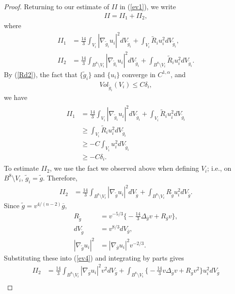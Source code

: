 \documentclass{amsart}
\newcommand{\Ri}{\widetilde{R}_i}
\newcommand{\wtg}{\widetilde{g}}
\newcommand{\di}{dV_{\widetilde{g}_i}}
\newcommand{\wti}{\widetilde{g}_i}
\theoremstyle{definition}
\theoremstyle{remark}
\numberwithin{equation}{section}
\begin{document}
\begin{proof}
Returning to our estimate of $II$ in (\ref{ev1}), we write
\begin{align} \label{ev2}
II = II_1 + II_2,
\end{align}
where
\begin{align*}II_1&=\frac{14}{3} \int_{V_i} |\nabla_{\wti} u_i |^2 \di +  \int_{V_i} \Ri u_i^2 \di,  \\
II_2 &= \frac{14}{3} \int_{B^8 \setminus V_i} |\nabla_{\wti} u_i |^2 \di +  \int_{B^8 \setminus V_i} \Ri u_i^2 \di.
\end{align*}
By (\ref{Rd2}), the fact that $\{ \wti \}$ and $\{ u_i \}$ converge in $C^{1,\alpha}$, and
\begin{align} \label{volU}
Vol_{\wti}(V_i) \leq C \delta_i,
\end{align}
we have
\begin{align} \label{ev3} \begin{split}
II_1 &= \frac{14}{3} \int_{V_i} |\nabla_{\wti} u_i |^2 \di +  \int_{V_i} \Ri u_i^2 \di \\
&\geq  \int_{V_i} \Ri u_i^2 \di \\
&\geq - C \int_{V_i} u_i^2 \di \\
&\geq - C \delta_i.
\end{split}
\end{align}
To estimate $II_2$, we use the fact we observed above when defining $V_i$; i.e., on $B^8 \setminus V_i$, $\wti = \wtg$.
Therefore,
\begin{align} \label{ev4}
II_2 &= \frac{14}{3} \int_{B^8 \setminus V_i} |\nabla_{\wtg} u_i |^2 dV_{\wtg} +  \int_{B^8 \setminus V_i} R_{\wtg} u_i^2 dV_{\wtg}.
\end{align}
Since $\wtg = v^{4/(n-2)} \overline{g}$,
\begin{align*}
R_{\wtg} &= v^{-5/3} \big\{ -\frac{14}{3} \Delta_{\overline{g}} v + R_{\overline{g}} v \big\}, \\
dV_{\wtg} &= v^{8/3}dV_{\overline{g}}, \\
|\nabla_{\wtg} u_i|^2 &= |\nabla_{\overline{g}} u_i|^2 v^{-2/3}.
\end{align*}
Substituting these into (\ref{ev4}) and integrating by parts gives
\begin{align*} %
II_2 &= \frac{14}{3} \int_{B^8 \setminus V_i} |\nabla_{\overline{g}} u_i |^2 v^2 dV_{\overline{g}}  +  \int_{B^8 \setminus V_i} \big\{ -\frac{14}{3} v \Delta_{\overline{g}} v + R_{\overline{g}} v^2 \big\} u_i^2 dV_{\overline{g}} \\

\end{align*}
\end{proof}
\end{document}
